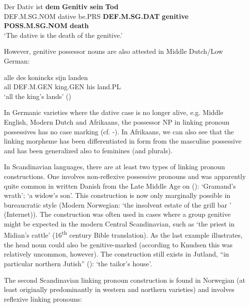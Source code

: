 \ea\label{}
\gll Der  Dativ  ist  \textbf{dem} \textbf{Genitiv} \textbf{sein} \textbf{Tod}\\
DEF.M.SG.NOM  dative  be.PRS  \textbf{DEF.M.SG.DAT} \textbf{genitive} \textbf{POSS.M.SG.NOM} \textbf{death}\\
\glt  ‘The dative is the death of the genitive.’
\z

 However, genitive possessor nouns are also attested in Middle Dutch/Low German:

\ea\label{}
\gll alle  des  konincks  sijn  landen\\
all  DEF.M.GEN  king.GEN  his  land.PL\\
\glt ‘all the king’s lands’ (\citet[58]{Norde1997})
\z

In Germanic varieties where the dative case is no longer alive, e.g. Middle English, Modern Dutch and Afrikaans, the possessor NP in linking pronoun possessives has no case marking (cf. -). In Afrikaans, we can also see that the linking morpheme  has been differentiated in form from the masculine possessive  and has been generalized also to feminines (and plurals).

In Scandinavian languages, there are at least two types of linking pronoun constructions. One involves non-reflexive possessive pronouns and was apparently quite common in written Danish from the Late Middle Age on (\citet[61]{Knudsen1941}): ‘Gramand’s wrath’;  ‘a widow’s son’. This construction is now only marginally possible in bureaucratic style (Modern Norwegian:  ‘the insolvent estate of the grill bar ’ (Internet)). The construction was often used in cases where a group genitive might be expected in the modern Central Scandinavian, such as  ‘the priest in Midian’s cattle’ (16\textsuperscript{th} century Bible translation). As the last example illustrates, the head noun could also be genitive-marked (according to Knudsen this was relatively uncommon, however). The construction still exists in Jutland, “in particular northern Jutish” (\citet[62]{Knudsen1941}):  ‘the tailor’s house’.

The second Scandinavian linking pronoun construction is found in Norwegian (at least originally predominantly in western and northern varieties) and involves reflexive linking pronouns:

